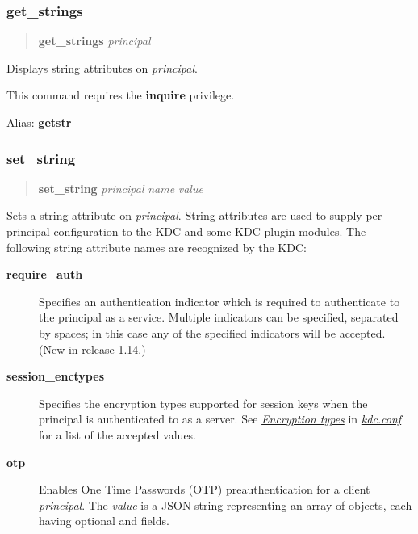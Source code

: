 \documentclass[letterpaper,10pt,english]{sphinxmanual}
\begin{document}
\subsubsection{get\_strings}
\label{admin/admin_commands/kadmin_local:id9}\label{admin/admin_commands/kadmin_local:get-strings}\label{admin/admin_commands/kadmin_local:list-principals-end}\begin{quote}

\textbf{get\_strings} \emph{principal}
\end{quote}

Displays string attributes on \emph{principal}.

This command requires the \textbf{inquire} privilege.

Alias: \textbf{getstr}
\label{admin/admin_commands/kadmin_local:get-strings-end}

\subsubsection{set\_string}
\label{admin/admin_commands/kadmin_local:id10}\label{admin/admin_commands/kadmin_local:set-string}\label{admin/admin_commands/kadmin_local:get-strings-end}\begin{quote}

\textbf{set\_string} \emph{principal} \emph{name} \emph{value}
\end{quote}

Sets a string attribute on \emph{principal}.  String attributes are used to
supply per-principal configuration to the KDC and some KDC plugin
modules.  The following string attribute names are recognized by the
KDC:
\begin{description}
\item[{\textbf{require\_auth}}] \leavevmode
Specifies an authentication indicator which is required to
authenticate to the principal as a service.  Multiple indicators
can be specified, separated by spaces; in this case any of the
specified indicators will be accepted.  (New in release 1.14.)

\item[{\textbf{session\_enctypes}}] \leavevmode
Specifies the encryption types supported for session keys when the
principal is authenticated to as a server.  See
{\hyperref[admin/conf_files/kdc_conf:encryption-types]{\emph{Encryption types}}} in {\hyperref[admin/conf_files/kdc_conf:kdc-conf-5]{\emph{kdc.conf}}} for a list of the
accepted values.

\item[{\textbf{otp}}] \leavevmode
Enables One Time Passwords (OTP) preauthentication for a client
\emph{principal}.  The \emph{value} is a JSON string representing an array
of objects, each having optional  and  fields.

\end{description}
\end{document}
